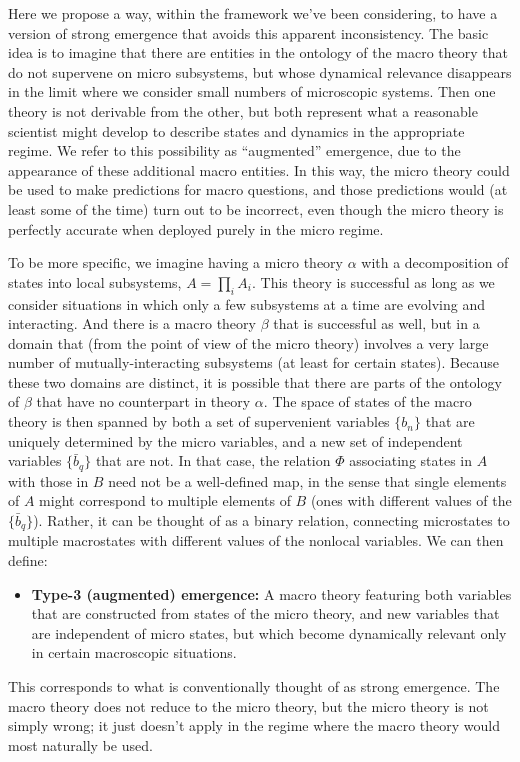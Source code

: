 \documentclass[12pt,english]{article}
\begin{document}
Here we propose a way, within the framework we've been considering, to have a version of strong emergence that avoids this apparent inconsistency.
The basic idea is to imagine that there are entities in the ontology of the macro theory that do not supervene on micro subsystems, but whose dynamical relevance disappears in the limit where we consider small numbers of microscopic systems.
Then one theory is not derivable from the other, but both represent what a reasonable scientist might develop to describe states and dynamics in the appropriate regime.
We refer to this possibility as ``augmented'' emergence, due to the appearance of these additional macro entities.
In this way, the micro theory could be used to make predictions for macro questions, and those predictions would (at least some of the time) turn out to be incorrect, even though the micro theory is perfectly accurate when deployed purely in the micro regime.

To be more specific, we imagine having a micro theory $\alpha$ with a decomposition of states into local subsystems, $A= \prod_i A_i$. 
This theory is successful as long as we consider situations in which only a few subsystems at a time are evolving and interacting. 
And there is a macro theory $\beta$ that is successful as well, but in a domain that (from the point of view of the micro theory) involves a very large number of mutually-interacting subsystems (at least for certain states). 
Because these two domains are distinct, it is possible that there are parts of the ontology of $\beta$ that have no counterpart in theory $\alpha$. 
The space of states of the macro theory is then spanned by both a set of supervenient variables $\{b_n\}$ that are uniquely determined by the micro variables, and a new set of independent variables $\{\bar{b}_q\}$ that are not.
In that case, the relation $\Phi$ associating states in  $A$  with those in $B$ need not be a well-defined map, in the sense that single elements of  $A$  might correspond to multiple elements of $B$ (ones with different values of the $\{\bar{b}_q\}$). 
Rather, it can be thought of as a binary relation, connecting microstates to multiple macrostates with different values of the nonlocal variables.
We can then define:
\begin{itemize}
    \item \textbf{Type-3 (augmented) emergence:} A macro theory featuring both variables that are constructed from states of the micro theory, and new variables that are independent of micro states, but which become dynamically relevant only in certain macroscopic situations.
\end{itemize}
This corresponds to what is conventionally thought of as strong emergence. The macro theory does not reduce to the micro theory, but the micro theory is not simply wrong; it just doesn't apply in the regime where the macro theory would most naturally be used.
\end{document}
